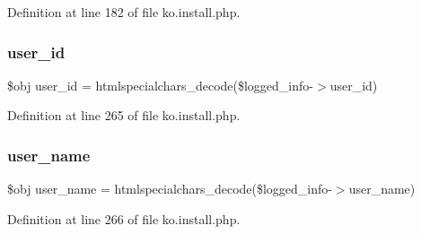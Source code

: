 Definition at line 182 of file ko.\+install.\+php.

\mbox{\label{ko_8install_8php_a74f1a394389d774e5b4cd5d1d15413f7}} 
\subsubsection{\texorpdfstring{user\+\_\+id}{user\_id}}
{\footnotesize\ttfamily \$obj user\+\_\+id = htmlspecialchars\+\_\+decode(\$logged\+\_\+info-\/$>$user\+\_\+id)}



Definition at line 265 of file ko.\+install.\+php.

\mbox{\label{ko_8install_8php_a115401aff7da80e73c66e9f76505426b}} 
\subsubsection{\texorpdfstring{user\+\_\+name}{user\_name}}
{\footnotesize\ttfamily \$obj user\+\_\+name = htmlspecialchars\+\_\+decode(\$logged\+\_\+info-\/$>$user\+\_\+name)}



Definition at line 266 of file ko.\+install.\+php.

